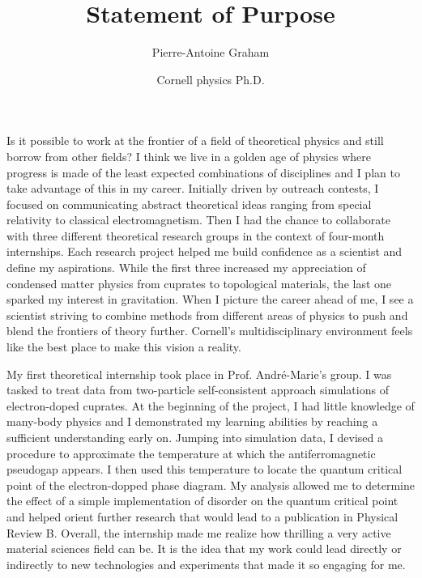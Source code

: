 \documentclass[12pt]{article}
\title{Statement of Purpose}
\author{Pierre-Antoine Graham}
\date{Cornell physics Ph.D.}
\begin{document}
\maketitle
\vspace{0.5cm}

Is it possible to work at the frontier of a field of theoretical physics and still borrow from other fields? I think we live in a golden age of physics where progress is made of the least expected combinations of disciplines and I plan to take advantage of this in my career. Initially driven by outreach contests, I focused on communicating abstract theoretical ideas ranging from special relativity to classical electromagnetism. Then I had the chance to collaborate with three different theoretical research groups in the context of four-month internships. Each research project helped me build confidence as a scientist and define my aspirations. While the first three increased my appreciation of condensed matter physics from cuprates to topological materials, the last one sparked my interest in gravitation. When I picture the career ahead of me, I see a scientist striving to combine methods from different areas of physics to push and blend the frontiers of theory further. Cornell's multidisciplinary environment feels like the best place to make this vision a reality. 
\vspace{0.4cm}

My first theoretical internship took place in Prof. André-Marie's group. I was tasked to treat data from two-particle self-consistent approach simulations of electron-doped cuprates. At the beginning of the project, I had little knowledge of many-body physics and I demonstrated my learning abilities by reaching a sufficient understanding early on. Jumping into simulation data, I devised a procedure to approximate the temperature at which the antiferromagnetic pseudogap appears. I then used this temperature to locate the quantum critical point of the electron-dopped phase diagram. My analysis allowed me to determine the effect of a simple implementation of disorder on the quantum critical point and helped orient further research that would lead to a publication in Physical Review B. Overall, the internship made me realize how thrilling a very active material sciences field can be. It is the idea that my work could lead directly or indirectly to new technologies and experiments that made it so engaging for me.\vspace{0.4cm} 
\end{document}
